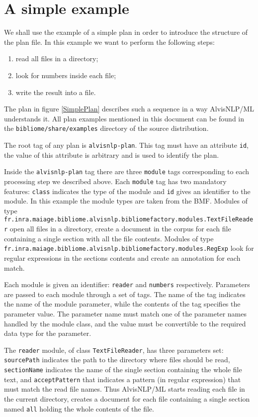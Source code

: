 \documentclass[a4paper]{book}
\begin{document}
\section{A simple example}
We shall use the example of a simple plan in order to introduce the structure of the plan file.
In this example we want to perform the following steps:
\begin{enumerate}
\item read all files in a directory;
\item look for numbers inside each file;
\item write the result into a file.
\end{enumerate}
The plan in figure \ref{SimplePlan} describes such a sequence in a way AlvisNLP/ML understands it.
All plan examples mentioned in this document can be found in the \texttt{bibliome/share/examples} directory of the source distribution.


The root tag of any plan is \texttt{alvisnlp-plan}.
This tag must have an attribute \texttt{id}, the value of this attribute is arbitrary and is used to identify the plan.

Inside the \texttt{alvisnlp-plan} tag there are three \texttt{module} tags corresponding to each processing step we described above.
Each \texttt{module} tag has two mandatory features: \texttt{class} indicates the type of the  module and \texttt{id} gives an identifier to the module.
In this example the module types are taken from the BMF.
Modules of type \texttt{fr.inra.maiage.bibliome.alvisnlp.bibliomefactory.modules.TextFileReader} open all files in a directory, create a document in the corpus for each file containing a single section with all the file contents.
Modules of type \texttt{fr.inra.maiage.bibliome.alvisnlp.bibliomefactory.modules.RegExp} look for regular expressions in the sections contents and create an annotation for each match.

Each module is given an identifier: \texttt{reader} and \texttt{numbers} respectively.
Parameters are passed to each module through a set of tags.
The name of the tag indicates the name of the module parameter, while the contents of the tag specifies the parameter value.
The parameter name must match one of the parameter names handled by the module class, and the value must be convertible to the required data type for the parameter.

The \texttt{reader} module, of class \texttt{TextFileReader}, has three parameters set: \texttt{sourcePath} indicates the path to the directory where files should be read, \texttt{sectionName} indicates the name of the single section containing the whole file text, and \texttt{acceptPattern} that indicates a pattern (in regular expression) that must match the read file names.
Thus AlvisNLP/ML starts reading each file in the current directory, creates a document for each file containing a single section named \texttt{all} holding the whole contents of the file.
\end{document}
